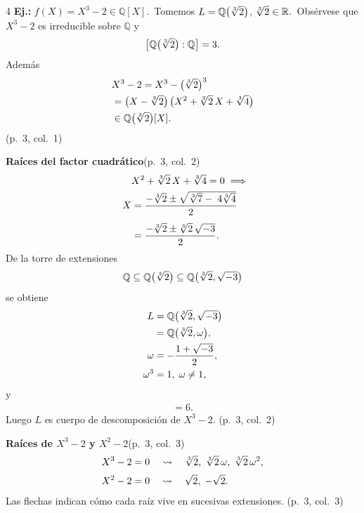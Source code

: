 \documentclass[landscape,a4paper]{article}
\begin{document}
\begin{multicols}{4}
\noindent\textbf{Ej.:} \;$f(X)=X^{3}-2\in\mathbb{Q}[X]$.\,
Tomemos $L=\mathbb{Q}\bigl(\root 3 \of 2\bigr)$, \;$\root 3 \of 2\in\mathbb{R}$.\,
Obsérvese que $X^{3}-2$ es irreducible sobre $\mathbb{Q}$ y
\begin{align*}
\bigl[\mathbb{Q}\bigl(\root 3 \of 2\bigr):\mathbb{Q}\bigr]=3.
\end{align*}
Además
\begin{align*}
&X^{3}-2 = X^{3}-\bigl(\root 3 \of 2\bigr)^{3}\\
        &=\bigl(X-\root 3 \of 2\bigr)\,\bigl(X^{2}+\root 3 \of 2\,X+\root 3 \of 4\bigr)
        \\ &\in\mathbb{Q}\bigl(\root 3 \of 2\bigr)[X].
\end{align*}
(p.~3, col.~1)

\noindent\textbf{Raíces del factor cuadrático}\hfill(p.~3, col.~2)\\
\begin{align*}
&X^{2}+\root 3 \of 2\,X+\root 3 \of 4 = 0
\;\Longrightarrow\\\
X&=\frac{-\root 3 \of 2 \pm
\sqrt{\root 3 \of 7-\;4\root 3 \of 4}}{2}\\[4pt]
 &=\frac{-\root 3 \of 2 \pm \root 3 \of 2\,\sqrt{-3}}{2}.
\end{align*}
De la torre de extensiones
\begin{align*}
\mathbb{Q}\subseteq\mathbb{Q}\bigl(\root 3 \of 2\bigr)\subseteq
\mathbb{Q}\bigl(\root 3 \of 2,\sqrt{-3}\bigr)
\end{align*}
se obtiene
\begin{align*}
L&=\mathbb{Q}\bigl(\root 3 \of 2,\sqrt{-3}\bigr)\\
           &=\mathbb{Q}\bigl(\root 3 \of 2,\omega\bigr),\\
\omega&=-\frac{1+\sqrt{-3}}{2},\;\\
\omega^{3}
&=1,\;\omega\ne1,
\end{align*}
y
\begin{align*}
[L:\mathbb{Q}]=6.
\end{align*}
Luego $L$ es cuerpo de descomposición de $X^{3}-2$. (p.~3, col.~2)

\noindent\textbf{Raíces de $X^{3}-2$ y $X^{2}-2$}\hfill(p.~3, col.~3)\\[-0.3em]
\begin{align*}
X^{3}-2=0 &\quad\leadsto\quad \root 3 \of 2,\;
           \root 3 \of 2\,\omega,\;
           \root 3 \of 2\,\omega^{2},\\[2pt]
X^{2}-2=0 &\quad\leadsto\quad \sqrt{2},\;-\sqrt{2}.
\end{align*}
Las flechas indican cómo cada raíz vive en sucesivas extensiones. (p.~3, col.~3)


\end{multicols}
\end{document}
